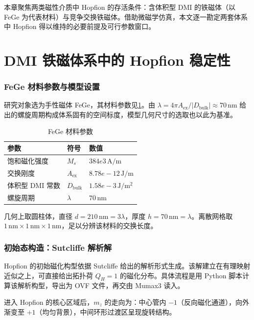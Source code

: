 \documentclass{article}
\begin{document}
本章聚焦两类磁性介质中 Hopfion 的存活条件：含体积型 DMI 的铁磁体（以 FeGe 为代表材料）与竞争交换铁磁体。借助微磁学仿真，本文逐一勘定两套体系中 Hopfion 得以维持的必要前提及可行参数窗口。


\section{DMI 铁磁体系中的 Hopfion 稳定性}

\subsubsection*{FeGe 材料参数与模型设置}
研究对象选为手性磁体 FeGe，其材料参数见\ref{tab:fege-params}。由 $\lambda = 4\pi A_{\text{ex}} / |D_{\text{bulk}}| \approx 70\,\mathrm{nm}$ 给出的螺旋周期构成体系固有的空间标度，模型几何尺寸的选取也以此为基准。

\begin{table}[htbp]
  \centering
  \caption{FeGe 材料参数}
  \label{tab:fege-params}
  \begin{tabular}{lll}
    \toprule
    参数 & 符号 & 数值 \\
    \midrule
    饱和磁化强度 & $M_s$ & $384e3\,\mathrm{A/m}$ \\
    交换刚度 & $A_{\text{ex}}$ & $8.78e-12\,\mathrm{J/m}$ \\
    体积型 DMI 常数 & $D_{\text{bulk}}$ & $1.58e-3\,\mathrm{J/m^2}$ \\
    螺旋周期 & $\lambda$ & $70\,\mathrm{nm}$ \\
    \bottomrule
  \end{tabular}
\end{table}

几何上取圆柱体，直径 $d = 210\,\mathrm{nm} = 3\lambda$，厚度 $h = 70\,\mathrm{nm} = \lambda$。离散网格取 $1\,\mathrm{nm} \times 1\,\mathrm{nm} \times 1\,\mathrm{nm}$，足以分辨该材料的交换长度。

\subsubsection*{初始态构造：Sutcliffe 解析解}
Hopfion 的初始磁化构型依据 Sutcliffe 给出的解析形式\cite{sutcliffe2018hopfions}生成。该解建立在有理映射近似之上，可直接给出拓扑荷 $Q_H = 1$ 的磁化分布。具体流程是用 Python 脚本计算该解析构型，导出为 OVF 文件，再交由 Mumax3 读入。

进入 Hopfion 的核心区域后，$m_z$ 的走向为：中心管内 $-1$（反向磁化通道），向外渐变至 $+1$（均匀背景），中间环形过渡区呈现旋转结构。
\end{document}
